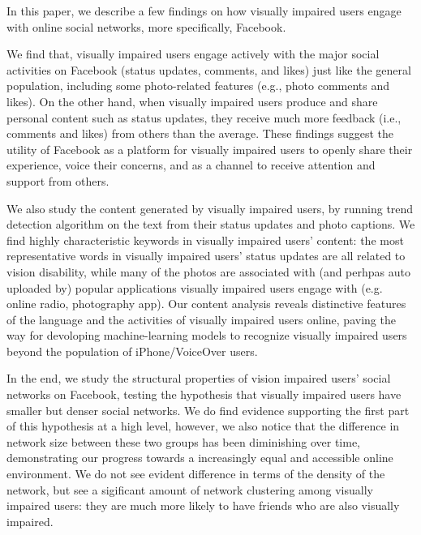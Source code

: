 \documentclass{sigchi}
\begin{document}



In this paper, we describe a few findings on how visually impaired users engage with online social networks, more specifically, Facebook. 

We find that, visually impaired users engage actively with the major social activities on Facebook (status updates, comments, and likes) just like the general population, including some photo-related features (e.g., photo comments and likes). On the other hand, when visually impaired users produce and share personal content such as status updates, they receive much more feedback (i.e., comments and likes) from others than the average. These findings suggest the utility of Facebook as a platform for visually impaired users to openly share their experience, voice their concerns, and as a channel to receive attention and support from others.

We also study the content generated by visually impaired users, by running trend detection algorithm on the text from their status updates and photo captions. We find highly characteristic keywords in visually impaired users' content: the most representative words in visually impaired users' status updates are all related to vision disability, while many of the photos are associated with (and perhpas auto uploaded by) popular applications  visually impaired users engage with (e.g. online radio, photography app). Our content analysis reveals distinctive features of the language and the activities of visually impaired users online, paving the way for devoloping machine-learning models to recognize visually impaired users beyond the population of iPhone/VoiceOver users. 

In the end, we study the structural properties of vision impaired users' social networks on Facebook, testing the hypothesis that  visually impaired users have smaller but denser social networks. We do find evidence supporting the first part of this hypothesis at a high level, however, we also notice that the difference in network size between these two groups has been diminishing over time, demonstrating our progress towards a increasingly equal and accessible online environment. We do not see evident difference in terms of the density of the network, but see a sigificant amount of network clustering among visually impaired users: they are much more likely to have friends who are also visually impaired. 
\end{document}
